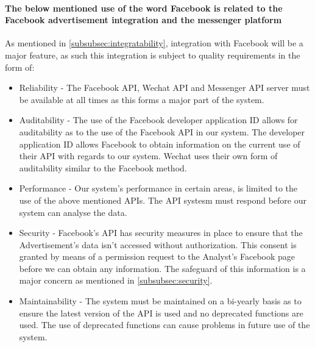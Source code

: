 \documentclass{article}
\begin{document}
		\paragraph{The below mentioned use of the word Facebook is related to the Facebook advertisement integration and the messenger platform}
		As mentioned in \ref{subsubsec:integratability}, integration with Facebook will be a major feature, as such this integration is subject to quality requirements in the form of:
		\begin{itemize}
			\item Reliability - The Facebook API, Wechat API and Messenger API server must be available at all times as this forms a major part of the system.
			\item Auditability - The use of the Facebook developer application ID allows for auditability as to the use of the Facebook API in our system. The developer application ID allows Facebook to obtain information on the current use of their API with regards to our system. Wechat uses their own form of auditability similar to the Facebook method.
			\item Performance - Our system's performance in certain areas, is limited to the use of the above mentioned APIs. The API systesm must respond before our system can analyse the data.
			\item Security - Facebook's API has security measures in place to ensure that the Advertisement's data isn't accessed without authorization. This consent is granted by means of a permission request to the Analyst's Facebook page before we can obtain any information. The safeguard of this information is a major concern as mentioned in \ref{subsubsec:security}.
			\item Maintainability - The system must be maintained on a bi-yearly basis as to ensure the latest version of the API is used and no deprecated functions are used. The use of deprecated functions can cause problems in future use of the system.
		\end{itemize}
\end{document}
